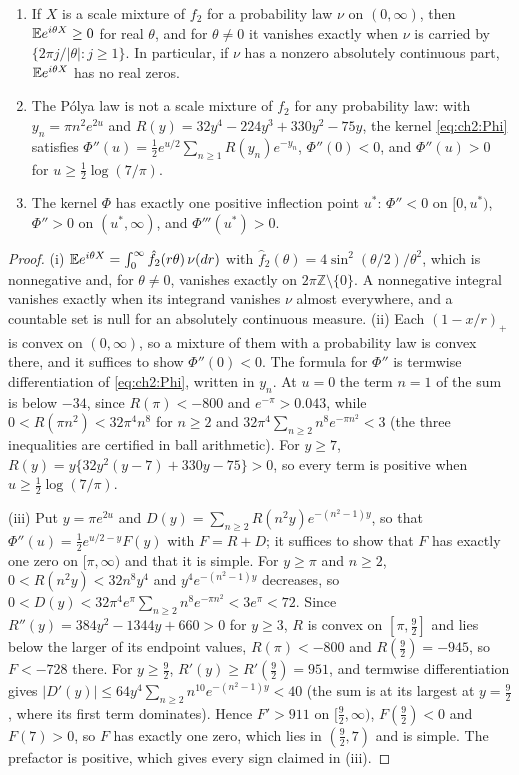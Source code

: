 \begin{proposition}\label{fm:prop:triangle}
\begin{enumerate}
\item[(i)] If $X$ is a scale mixture of $f_2$ for a probability law $\nu$ on $(0,\infty)$, then $\mathbb{E} e^{i\theta X}\ge0$ for real $\theta$, and for $\theta\ne0$ it vanishes exactly when $\nu$ is carried by $\{2\pi j/|\theta|:j\ge1\}$. In particular, if $\nu$ has a nonzero absolutely continuous part, $\mathbb{E} e^{i\theta X}$ has no real zeros.
\item[(ii)] The P\'olya law is not a scale mixture of $f_2$ for any probability law: with $y_n=\pi n^2e^{2u}$ and $R(y)=32y^4-224y^3+330y^2-75y$, the kernel \eqref{eq:ch2:Phi} satisfies $\Phi''(u)=\frac12e^{u/2}\sum_{n\ge1}R(y_n)e^{-y_n}$, $\Phi''(0)<0$, and $\Phi''(u)>0$ for $u\ge\frac12\log(7/\pi)$.
\item[(iii)] The kernel $\Phi$ has exactly one positive inflection point $u^*$: $\Phi''<0$ on $[0,u^*)$, $\Phi''>0$ on $(u^*,\infty)$, and $\Phi'''(u^*)>0$.
\end{enumerate}
\end{proposition}

\begin{proof}
(i) $\mathbb{E} e^{i\theta X}=\int_0^\infty\hat f_2(r\theta)\,\nu(dr)$ with $\hat f_2(\theta)=4\sin^2(\theta/2)/\theta^2$, which is nonnegative and, for $\theta\ne0$, vanishes exactly on $2\pi\mathbb Z\setminus\{0\}$. A nonnegative integral vanishes exactly when its integrand vanishes $\nu$ almost everywhere, and a countable set is null for an absolutely continuous measure. (ii) Each $(1-x/r)_+$ is convex on $(0,\infty)$, so a mixture of them with a probability law is convex there, and it suffices to show $\Phi''(0)<0$. The formula for $\Phi''$ is termwise differentiation of \eqref{eq:ch2:Phi}, written in $y_n$. At $u=0$ the term $n=1$ of the sum is below $-34$, since $R(\pi)<-800$ and $e^{-\pi}>0.043$, while $0<R(\pi n^2)<32\pi^4n^8$ for $n\ge2$ and $32\pi^4\sum_{n\ge2}n^8e^{-\pi n^2}<3$ (the three inequalities are certified in ball arithmetic). For $y\ge7$, $R(y)=y\{32y^2(y-7)+330y-75\}>0$, so every term is positive when $u\ge\frac12\log(7/\pi)$.

(iii) Put $y=\pi e^{2u}$ and $D(y)=\sum_{n\ge2}R(n^2y)e^{-(n^2-1)y}$, so that $\Phi''(u)=\frac12e^{u/2-y}F(y)$ with $F=R+D$; it suffices to show that $F$ has exactly one zero on $[\pi,\infty)$ and that it is simple. For $y\ge\pi$ and $n\ge2$, $0<R(n^2y)<32n^8y^4$ and $y^4e^{-(n^2-1)y}$ decreases, so $0<D(y)<32\pi^4e^{\pi}\sum_{n\ge2}n^8e^{-\pi n^2}<3e^\pi<72$. Since $R''(y)=384y^2-1344y+660>0$ for $y\ge3$, $R$ is convex on $[\pi,\frac92]$ and lies below the larger of its endpoint values, $R(\pi)<-800$ and $R(\frac92)=-945$, so $F<-728$ there. For $y\ge\frac92$, $R'(y)\ge R'(\frac92)=951$, and termwise differentiation gives $|D'(y)|\le64y^4\sum_{n\ge2}n^{10}e^{-(n^2-1)y}<40$ (the sum is at its largest at $y=\frac92$, where its first term dominates). Hence $F'>911$ on $[\frac92,\infty)$, $F(\frac92)<0$ and $F(7)>0$, so $F$ has exactly one zero, which lies in $(\frac92,7)$ and is simple. The prefactor is positive, which gives every sign claimed in (iii).
\end{proof}

